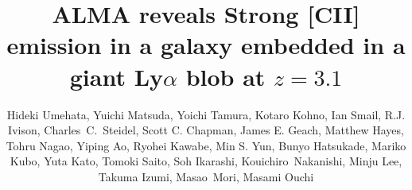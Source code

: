 \documentclass[apj]{emulateapj}
\begin{document}

\title{
ALMA reveals Strong [CII]  emission in a galaxy embedded in a giant Ly$\alpha$ blob at $z=3.1$
}


\author{
Hideki Umehata, Yuichi Matsuda, Yoichi Tamura, Kotaro Kohno, Ian Smail, R.J. Ivison, Charles~C.~Steidel, Scott C. Chapman, James E. Geach, Matthew Hayes, Tohru Nagao, Yiping Ao, Ryohei Kawabe, Min S. Yun, Bunyo Hatsukade, Mariko Kubo, Yuta Kato, Tomoki Saito, Soh Ikarashi, Kouichiro~Nakanishi, Minju Lee, Takuma Izumi, Masao~Mori, Masami Ouchi
}
\end{document}

